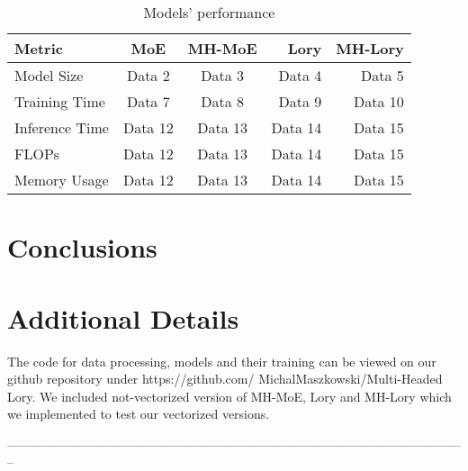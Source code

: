 \documentclass[12pt]{article}
\begin{document}
\begin{table}[h!]
\centering
\begin{tabular}{|l|c|c|r|r|}
\hline
Metric & \textbf{MoE} & \textbf{MH-MoE} & \textbf{Lory} & \textbf{MH-Lory} \\
\hline
Model Size & Data 2 & Data 3 & Data 4 & Data 5 \\
Training Time & Data 7 & Data 8 & Data 9 & Data 10 \\
Inference Time  & Data 12 & Data 13 & Data 14 & Data 15 \\
FLOPs & Data 12 & Data 13 & Data 14 & Data 15 \\
Memory Usage & Data 12 & Data 13 & Data 14 & Data 15 \\

\hline
\end{tabular}
\caption{Models' performance}
\label{tab:performance_table}
\end{table}

\section{Conclusions}



%


\printbibliography 

\appendix


\section{Additional Details}
The code for data processing, models and their training can be viewed on our github repository under https://github.com/
MichalMaszkowski/Multi-Headed Lory. We included not-vectorized version of MH-MoE, Lory and MH-Lory which we implemented to test our vectorized versions. 


% 
--------------------------------------------------------------------------------------------------------------
\end{document}
